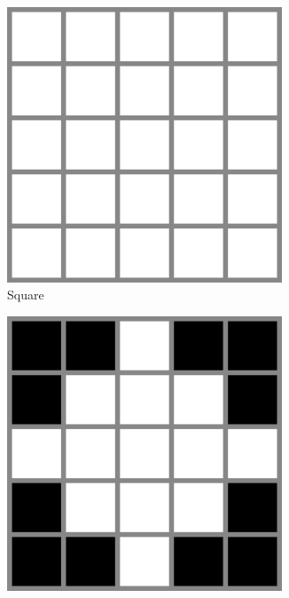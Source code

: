 \documentclass{article}
\begin{document}
\begin{CJK*}{UTF8}{bkai}
\begin{figure}[h]
\centering
    \begin{subfigure}{.3\textwidth}
        \centering
        \includegraphics[width=0.9\textwidth]{imgs/RECT.png}
        \caption{Square}
    \end{subfigure}
    \begin{subfigure}{.3\textwidth}
        \centering
        \includegraphics[width=0.9\textwidth]{imgs/diamond.png}

\end{subfigure}
\end{figure}
\end{CJK*}
\end{document}
